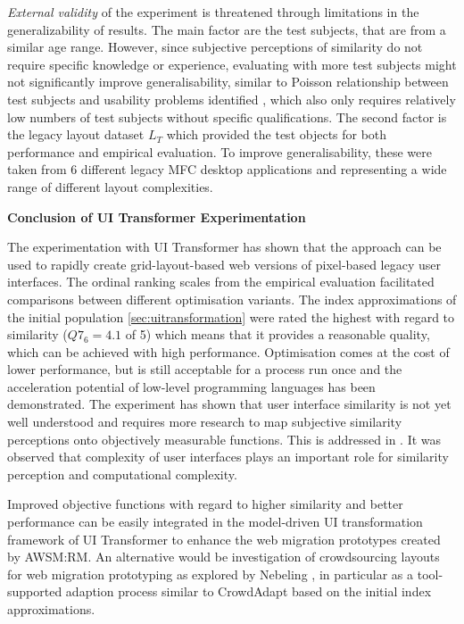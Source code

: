 \emph{External validity} of the experiment is threatened through limitations in the generalizability of results.
The main factor are the test subjects, that are from a similar age range.
However, since subjective perceptions of similarity do not require specific knowledge or experience, evaluating with more test subjects might not significantly improve generalisability, similar to Poisson relationship between test subjects and usability problems identified \autocite{Nielsen1993}, which also only requires relatively low numbers of test subjects without specific qualifications.
The second factor is the legacy layout dataset \(L_T\) which provided the test objects for both performance and empirical evaluation.
To improve generalisability, these were taken from 6 different legacy MFC desktop applications and representing a wide range of different layout complexities.

\textbf{Conclusion of UI Transformer Experimentation}

The experimentation with UI Transformer has shown that the approach can be used to rapidly create grid-layout-based web versions of pixel-based legacy user interfaces.
The ordinal ranking scales from the empirical evaluation facilitated comparisons between different optimisation variants.
The index approximations of the initial population \cref{sec:uitransformation} were rated the highest with regard to similarity (\(Q7_6=4.1\) of 5) which means that it provides a reasonable quality, which can be achieved with high performance.
Optimisation comes at the cost of lower performance, but is still acceptable for a process run once and the acceleration potential of low-level programming languages has been demonstrated.
The experiment has shown that user interface similarity is not yet well understood and requires more research to map subjective similarity perceptions onto objectively measurable functions.
This is addressed in .
It was observed that complexity of user interfaces plays an important role for similarity perception and computational complexity.

Improved objective functions with regard to higher similarity and better performance can be easily integrated in the model-driven UI transformation framework of UI Transformer to enhance the web migration prototypes created by AWSM:RM.
An alternative would be investigation of crowdsourcing layouts for web migration prototyping as explored by Nebeling \autocite{Nebeling2012}, in particular as a tool-supported adaption process similar to CrowdAdapt \autocite{Nebeling2013CrowdAdapt} based on the initial index approximations.

